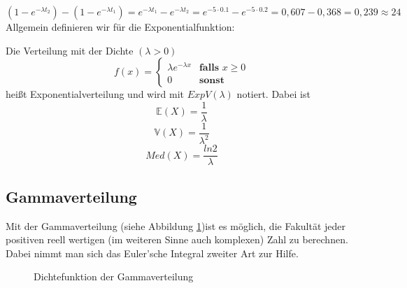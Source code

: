 {    \[
    \left(1-e^{-\lambda t_{2}}\right)-\left(1-e^{-\lambda
    t_{1}}\right)=e^{-\lambda t_{1}}-e^{-\lambda
    t_{2}}=e^{-5\cdot 0.1}-e^{-5\cdot 0.2}=0,607-0,368=0,239\approx 24
    \]
    Allgemein definieren wir für die Exponentialfunktion:

    \begin{definition}
    Die Verteilung mit der Dichte $\left(\lambda >0\right)$ 
    \[
    f\left(x\right)=\begin{cases}
        \lambda e^{-\lambda x} & \textbf{falls $x\ge 0$}\\
        0 & \textbf{sonst}
        \end{cases}
    \]
    heißt Exponentialverteilung und wird mit $ExpV\left(\lambda\right)$
    notiert. Dabei ist
    \[\mathbb E\left(X\right)=\frac{1}{\lambda }\]
    \[\mathbb V\left(X\right)=\frac{1}{\lambda ^{2}}\]
    \[Med\left(X\right)=\frac{ln2}{\lambda}\]
    \end{definition}
    
    \subsection{Gammaverteilung}

    \label{sec:gammaverteilung}

    Mit der Gammaverteilung (siehe Abbildung \ref{fig:gammaverteilung})ist es möglich, die Fakultät jeder positiven
    reell wertigen (im weiteren Sinne auch komplexen) Zahl zu berechnen.
    Dabei nimmt man sich das Euler'sche Integral zweiter
    Art zur Hilfe.

    {
        \def\avala{1}
        \def\lvala{2}

        \def\avalb{2}
        \def\lvalb{2}

        \def\avalc{3}
        \def\lvalc{2}

        \def\avald{1}
        \def\lvald{3}

        \def\avale{1}
        \def\lvale{1}

        \def\xmax{7}
        \begin{figure}
            \begin{tikzpicture}
                
            \end{tikzpicture}
            \caption{Dichtefunktion der Gammaverteilung}
           \label{fig:gammaverteilung}
        \end{figure}
    }


}
